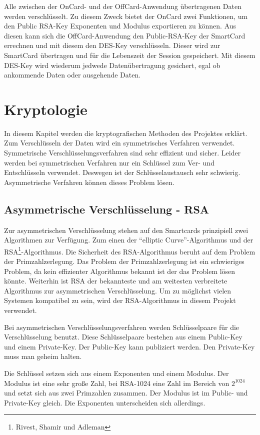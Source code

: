 \documentclass[parskip]{scrartcl}
\begin{document}
		Alle zwischen der OnCard- und der OffCard-Anwendung übertragenen Daten werden verschlüsselt. Zu diesem Zweck bietet der OnCard zwei Funktionen, um den Public RSA-Key Exponenten und Modulus exportieren zu können. Aus diesen kann sich die OffCard-Anwendung den Public-RSA-Key der SmartCard errechnen und mit diesem den DES-Key verschlüsseln. Dieser wird zur SmartCard übertragen und für die Lebenszeit der Session gespeichert. Mit diesem DES-Key wird wiederum jedwede Datenübertragung gesichert, egal ob ankommende Daten oder ausgehende Daten.
	\section{Kryptologie}
		In diesem Kapitel werden die kryptografischen Methoden des Projektes erklärt. Zum Verschlüsseln der Daten wird ein symmetrisches Verfahren verwendet. Symmetrische Verschlüsselungsverfahren sind sehr effizient und sicher. Leider werden bei symmet\-rischen Verfahren nur ein Schlüssel zum Ver- und Entschlüsseln verwendet. Deswegen ist der Schlüsselaustausch sehr schwierig. Asymmetrische Verfahren können dieses Problem lösen.
		\subsection{Asymmetrische Verschlüsselung - RSA}
			Zur asymmetrischen Verschlüsselung stehen auf den Smartcards prinzipiell zwei Algorithmen zur Verfügung. Zum einen der \enquote{elliptic Curve}-Algorithmus und der RSA\footnote{Rivest, Shamir und Adleman}-Algorithmus. Die Sicherheit des RSA-Algorithmus beruht auf dem Problem der Prim\-zahl\-zerlegung. Das Problem der Primzahlzerlegung ist ein schwieriges Problem, da kein effizienter Algorithmus bekannt ist der das Problem lösen könnte. Weiterhin ist RSA der bekannteste und am weitesten verbreitete Algorithmus zur asymmetrischen Verschlüsselung. Um zu möglichst vielen Systemen kompatibel zu sein, wird der RSA-Algorithmus in diesem Projekt verwendet.
			
			Bei asymmetrischen Verschlüsselungsverfahren werden Schlüsselpaare für die Verschlüs\-selung benutzt. Diese Schlüsselpaare bestehen aus einem Public-Key und einem Private-Key. Der Public-Key kann publiziert werden. Den Private-Key muss man geheim halten.
		
			Die Schlüssel setzen sich aus einem Exponenten und einem Modulus. Der Modulus ist eine sehr große Zahl, bei RSA-1024 eine Zahl im Bereich von $ 2^{1024} $ und setzt sich aus zwei Primzahlen zusammen. Der Modulus ist im Public- und Private-Key gleich. Die Exponenten unterscheiden sich allerdings.
		
\end{document}
